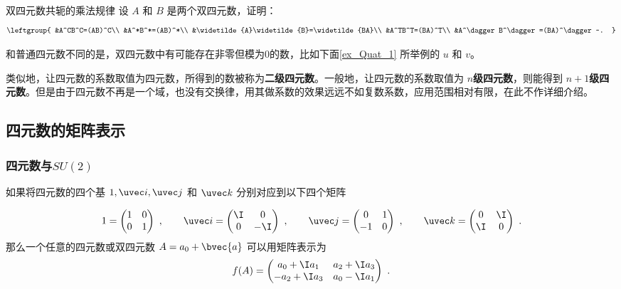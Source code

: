 \begin{exercise}{双四元数共轭的乘法规律}
设 $A$ 和 $B$ 是两个双四元数，证明：
\begin{equation}
\leftgroup{
&A^CB^C=(AB)^C\\
&A^*B^*=(AB)^*\\
&\widetilde{A}\widetilde{B}=\widetilde{BA}\\
&A^TB^T=(BA)^T\\
&A^\dagger B^\dagger=(BA)^\dagger~.
}
\end{equation}

\end{exercise}

和普通四元数不同的是，双四元数中有可能存在非零但模为0的数，比如下面\autoref{ex_Quat_1} 所举例的 $u$ 和 $v$。

类似地，让四元数的系数取值为四元数，所得到的数被称为\textbf{二级四元数}。一般地，让四元数的系数取值为 $n$\textbf{级四元数}，则能得到 $n+1$\textbf{级四元数}。但是由于四元数不再是一个域，也没有交换律，用其做系数的效果远远不如复数系数，应用范围相对有限，在此不作详细介绍。


\subsection{四元数的矩阵表示}
\subsubsection{四元数与$SU(2)$}

如果将四元数的四个基 $1, \uvec i, \uvec j$ 和 $\uvec k$ 分别对应到以下四个矩阵

\begin{equation}
1=\begin{pmatrix}1&0\\0&1\end{pmatrix} ~,
\qquad
\uvec i=\begin{pmatrix}\I&0\\0&-\I\end{pmatrix}~,
\qquad
\uvec j=\begin{pmatrix}0&1\\-1&0\end{pmatrix}~,
\qquad
\uvec k=\begin{pmatrix}0&\I\\\I&0\end{pmatrix} ~.
\end{equation}
那么一个任意的四元数或双四元数 $A=a_0+\bvec{a}$ 可以用矩阵表示为
\begin{equation}
f(A)=\begin{pmatrix}a_0+\I a_1&a_2+\I a_3\\-a_2+\I a_3&a_0-\I a_1 \end{pmatrix} ~.
\end{equation}

